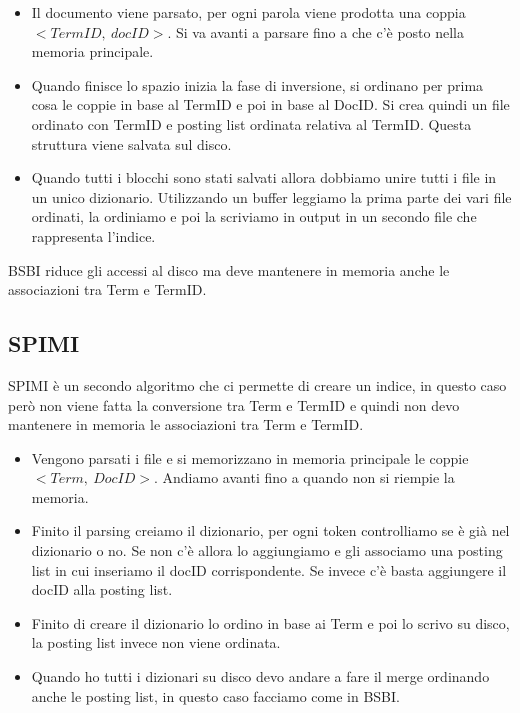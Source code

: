 \documentclass[14pt]{extreport}
\begin{document}
\begin{itemize}
    \item Il documento viene parsato, per ogni parola viene prodotta una coppia $<TermID, \ docID>$. Si va avanti a parsare fino a che c'è posto nella memoria principale.
    \item Quando finisce lo spazio inizia la fase di inversione, si ordinano per prima cosa le coppie in base al TermID e poi in base al DocID. Si crea quindi un file ordinato con TermID e posting list ordinata relativa al TermID.
    Questa struttura viene salvata sul disco.
    \item Quando tutti i blocchi sono stati salvati allora dobbiamo unire tutti i file in un unico dizionario. Utilizzando un buffer leggiamo la prima parte dei vari file ordinati, la ordiniamo e poi la scriviamo in output in un secondo file che rappresenta l'indice.
    
\end{itemize}

BSBI riduce gli accessi al disco ma deve mantenere in memoria anche le associazioni tra Term e TermID.

\subsection{SPIMI}

SPIMI è un secondo algoritmo che ci permette di creare un indice, in questo caso però non viene fatta la conversione tra Term e TermID e quindi non devo mantenere in memoria le associazioni tra Term e TermID.

\begin{itemize}
    \item Vengono parsati i file e si memorizzano in memoria principale le coppie $<Term, \ DocID>$. Andiamo avanti fino a quando non si riempie la memoria.
    \item Finito il parsing creiamo il dizionario, per ogni token controlliamo se è già nel dizionario o no. Se non c'è allora lo aggiungiamo e gli associamo una posting list in cui inseriamo il docID corrispondente. Se invece c'è basta aggiungere il docID alla posting list.
    \item Finito di creare il dizionario lo ordino in base ai Term e poi lo scrivo su disco, la posting list invece non viene ordinata.
    \item Quando ho tutti i dizionari su disco devo andare a fare il merge ordinando anche le posting list, in questo caso facciamo come in BSBI.
\end{itemize}
\end{document}

